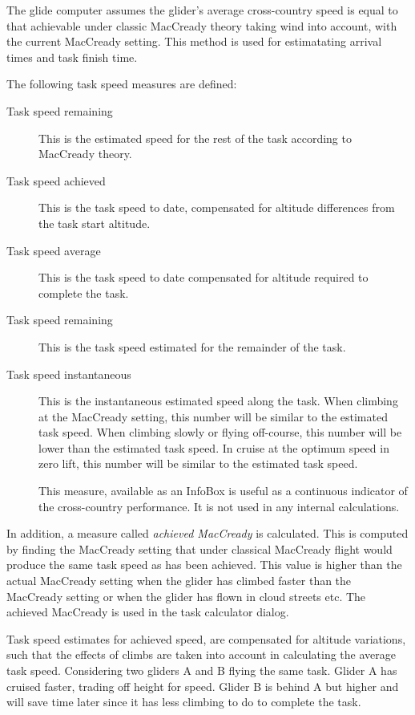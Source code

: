 \documentclass[a4paper,12pt]{refrep}
\newcommand{\InfoBox}[0]{{InfoBox}}
\begin{document}
The glide computer assumes the glider's average cross-country speed is
equal to that achievable under classic MacCready theory taking wind
into account, with the current MacCready setting.  This method is used
for estimatating arrival times and task finish time.

The following task speed measures are defined:
\begin{description}
\item[Task speed remaining]  This is the estimated speed for the rest of
the task according to MacCready theory.
\item[Task speed achieved]  This is the task speed to date, compensated
for altitude differences from the task start altitude.
\item[Task speed average]  This is the task speed to date compensated
for altitude required to complete the task.
\item[Task speed remaining]  This is the task speed estimated for the
  remainder of the task.
\item[Task speed instantaneous]  This is the instantaneous estimated speed 
along the task.  When climbing at the MacCready setting, this number
will be similar to the estimated task speed.  When climbing slowly or
flying off-course, this number will be lower than the estimated task
speed.  In cruise at the optimum speed in zero lift, this number will
be similar to the estimated task speed.

This measure, available as an {\InfoBox} is useful as a continuous
indicator of the cross-country performance.  It is not used in any
internal calculations.
\end{description}

In addition, a measure called {\em achieved MacCready} is calculated.
This is computed by finding the MacCready setting that under classical
MacCready flight would produce the same task speed as has been
achieved.  This value is higher than the actual MacCready setting when
the glider has climbed faster than the MacCready setting or when the
glider has flown in cloud streets etc.  The achieved MacCready is used
in the task calculator dialog.

Task speed estimates for achieved speed, are compensated for altitude
variations, such that the effects of climbs are taken into account in
calculating the average task speed.  Considering two gliders A and B
flying the same task.  Glider A has cruised faster, trading off height
for speed.  Glider B is behind A but higher and will save time later
since it has less climbing to do to complete the task.
\end{document}
